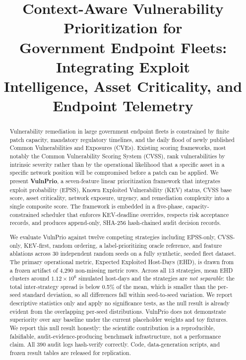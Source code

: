 \documentclass[journal]{IEEEtran}
\begin{document}
\title{Context-Aware Vulnerability Prioritization for\\
       Government Endpoint Fleets: Integrating Exploit\\
       Intelligence, Asset Criticality, and Endpoint Telemetry}

\author{%
}

\maketitle


\begin{abstract}
Vulnerability remediation in large government endpoint fleets is
constrained by finite patch capacity, mandatory regulatory
timelines, and the daily flood of newly published Common
Vulnerabilities and Exposures (CVEs).  Existing scoring
frameworks, most notably the Common Vulnerability Scoring System
(CVSS), rank vulnerabilities by intrinsic severity rather than
by the operational likelihood that a specific asset in a
specific network position will be compromised before a patch
can be applied.  We present \textbf{VulnPrio}, a seven-feature
linear prioritization framework that integrates exploit
probability (EPSS), Known Exploited Vulnerability (KEV) status,
CVSS base score, asset criticality, network exposure, urgency,
and remediation complexity into a single composite score.  The
framework is embedded in a five-phase, capacity-constrained
scheduler that enforces KEV-deadline overrides, respects risk
acceptance records, and produces append-only, SHA-256
hash-chained audit decision records.

We evaluate VulnPrio against twelve competing strategies
including EPSS-only, CVSS-only, KEV-first, random ordering, a
label-prioritizing oracle reference, and feature ablations across 30 independent random seeds on a
fully synthetic, seeded fleet dataset.  The primary operational
metric, Expected Exploited Host-Days (EHD), is drawn from a frozen
artifact of 4,290 non-missing metric rows.  Across all 13 strategies,
mean EHD clusters around $1.12 \times 10^6$ simulated host-days and the
strategies are \emph{not separable}: the total inter-strategy spread is
below 0.5\% of the mean, which is smaller than the per-seed standard
deviation, so all differences fall within seed-to-seed variation.  We
report descriptive statistics only and apply no significance tests, as
the null result is already evident from the overlapping per-seed
distributions.  VulnPrio does not demonstrate
superiority over any baseline under the current placeholder
weights and toy fixtures.  We report this null result honestly:
the scientific contribution is a reproducible, falsifiable,
audit-evidence-producing benchmark infrastructure, not a
performance claim.  All 390 audit logs hash-verify correctly.
Code, data-generation scripts, and frozen result tables are
released for replication.
\end{abstract}
\end{document}
